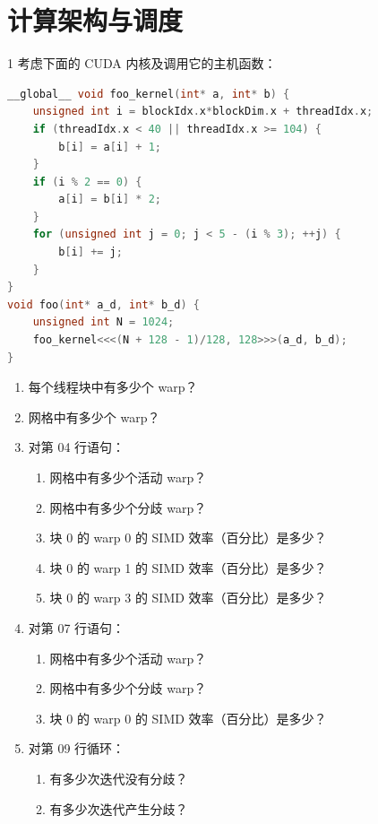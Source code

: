 \chapter{计算架构与调度}

\begin{solutionexercise}{1}
\problemheading 考虑下面的 CUDA 内核及调用它的主机函数：
\begin{lstlisting}[language=C++,firstnumber=1]
__global__ void foo_kernel(int* a, int* b) {
    unsigned int i = blockIdx.x*blockDim.x + threadIdx.x;
    if (threadIdx.x < 40 || threadIdx.x >= 104) {
        b[i] = a[i] + 1;
    }
    if (i % 2 == 0) {
        a[i] = b[i] * 2;
    }
    for (unsigned int j = 0; j < 5 - (i % 3); ++j) {
        b[i] += j;
    }
}
void foo(int* a_d, int* b_d) {
    unsigned int N = 1024;
    foo_kernel<<<(N + 128 - 1)/128, 128>>>(a_d, b_d);
}
\end{lstlisting}
\begin{enumerate}[label=\alph*.,leftmargin=2.2em]
  \item 每个线程块中有多少个 warp？
  \item 网格中有多少个 warp？
  \item 对第 04 行语句：
    \begin{enumerate}[label=\roman*.,leftmargin=2em]
      \item 网格中有多少个活动 warp？
      \item 网格中有多少个分歧 warp？
      \item 块 0 的 warp 0 的 SIMD 效率（百分比）是多少？
      \item 块 0 的 warp 1 的 SIMD 效率（百分比）是多少？
      \item 块 0 的 warp 3 的 SIMD 效率（百分比）是多少？
    \end{enumerate}
  \item 对第 07 行语句：
    \begin{enumerate}[label=\roman*.,leftmargin=2em]
      \item 网格中有多少个活动 warp？
      \item 网格中有多少个分歧 warp？
      \item 块 0 的 warp 0 的 SIMD 效率（百分比）是多少？
    \end{enumerate}
  \item 对第 09 行循环：
    \begin{enumerate}[label=\roman*.,leftmargin=2em]
      \item 有多少次迭代没有分歧？
      \item 有多少次迭代产生分歧？
    \end{enumerate}
\end{enumerate}


\end{solutionexercise}

